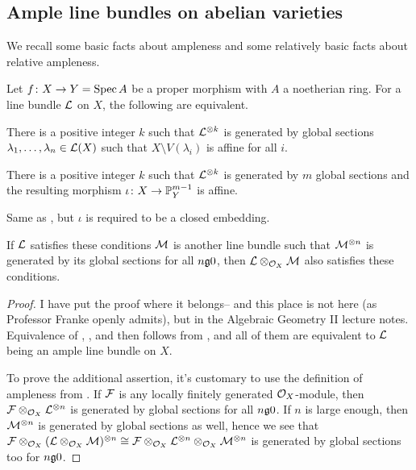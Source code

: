 \documentclass[a4paper,parskip=half,numbers=enddot, DIV=12]{scrreprt}
\begin{document}
\subsection{Ample line bundles on abelian varieties}
We recall some basic facts about  ampleness and some relatively basic facts about relative ampleness.

\begin{prop}
	Let $f\colon X\morphism Y=\Spec A$ be a proper morphism with $A$ a noetherian ring. For a line bundle $\mathcal{L}$ on $X$, the following are equivalent.
	\begin{alphanumerate}
		\item There is a positive integer $k$ such that $\mathcal{L}^{\otimes k}$ is generated by global sections $\lambda_1,\ldots,\lambda_n\in\mathcal{L}(X)$ such that $X\setminus V(\lambda_i)$ is affine for all $i$.
		\item There is a positive integer $k$ such that $\mathcal{L}^{\otimes k}$ is generated by $m$ global sections and the resulting morphism $\iota\colon X\morphism \IP_Y^{m-1}$ is affine.
		\item Same as , but $\iota$ is required to be a closed embedding.
	\end{alphanumerate}
	If $\mathcal{L}$ satisfies these conditions $\mathcal{M}$ is another line bundle such that  $\mathcal{M}^{\otimes n}$ is generated by its global sections for all $n\gge 0$, then $\mathcal{L}\otimes_{\mathcal{O}_X}\mathcal{M}$ also satisfies these conditions.
\end{prop}
\begin{proof}
	I have put the proof where it belongs-- and this place is not here (as Professor Franke openly admits), but in the Algebraic Geometry II lecture notes. Equivalence of , , and  then follows from \cite[Theorem~6 and Lemma~2.5.2]{alggeo2}, and all of them are equivalent to $\mathcal{L}$ being an ample line bundle on $X$.
	
	To prove the additional assertion, it's customary to use the definition of ampleness from \cite[Definition~2.2.1]{alggeo2}. If $\mathcal{F}$ is any locally finitely generated $\mathcal{O}_X$-module, then $\mathcal{F}\otimes_{\mathcal{O}_X}\mathcal{L}^{\otimes n}$ is generated by global sections for all $n\gge 0$. If $n$ is large enough, then $\mathcal{M}^{\otimes n}$ is generated by global sections as well, hence we see that $\mathcal{F}\otimes_{\mathcal{O}_X}(\mathcal{L}\otimes_{\mathcal{O}_X} \mathcal{M})^{\otimes n}\cong \mathcal{F}\otimes_{\mathcal{O}_X}\mathcal{L}^{\otimes n}\otimes_{\mathcal{O}_X}\mathcal{M}^{\otimes n}$ is generated by global sections too for $n\gge 0$.
\end{proof}
\end{document}

